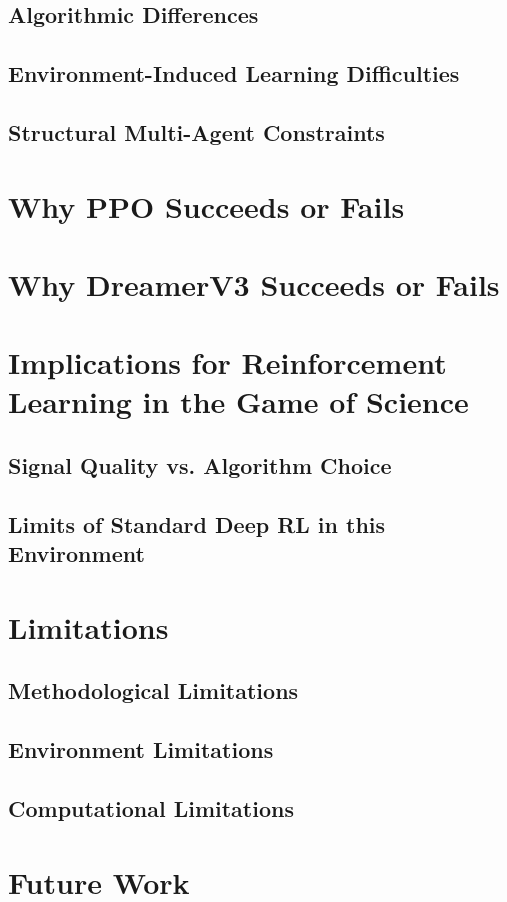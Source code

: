 \documentclass[english,bachelor]{hsluthesis}
\begin{document}
\subsection{Algorithmic Differences}
\subsection{Environment-Induced Learning Difficulties}
\subsection{Structural Multi-Agent Constraints}
\section{Why PPO Succeeds or Fails}
\section{Why DreamerV3 Succeeds or Fails}

\section{Implications for Reinforcement Learning in the Game of Science}
\subsection{Signal Quality vs. Algorithm Choice}
\subsection{Limits of Standard Deep RL in this Environment}

\section{Limitations}
\subsection{Methodological Limitations}
\subsection{Environment Limitations}
\subsection{Computational Limitations}

\section{Future Work}
\end{document}
